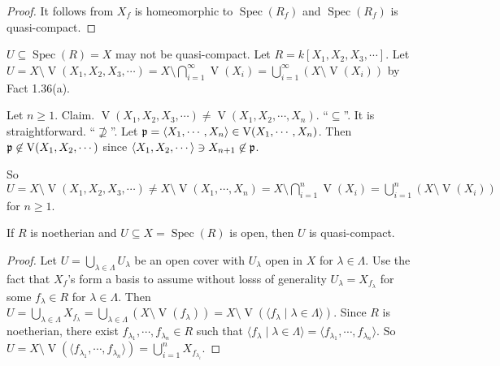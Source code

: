 \begin{proof}
    It follows from $X_f$ is homeomorphic to $\operatorname{Spec}(R_f)$ and $\operatorname{Spec}(R_f)$ is quasi-compact.
\end{proof}

\begin{example*}
    $U \subseteq \operatorname{Spec}(R) = X$ may not be quasi-compact. Let $R = k[X_1,X_2,X_3,\cdots]$. Let $U = X \setminus \operatorname{V}(X_1,X_2,X_3,\cdots) = X \setminus \bigcap_{i=1}^{\infty} \operatorname{V}(X_i) = \bigcup_{i=1}^\infty (X \setminus \operatorname{V}(X_i))$ by Fact 1.36(a). \par 
    Let $n \geq 1$. Claim. $\operatorname{V}(X_1,X_2,X_3,\cdots) \neq \operatorname{V}(X_1,X_2,\cdots,X_n)$. ``$\subseteq$''. It is straightforward. ``$\not \supseteq$''. Let $\mathfrak{p} = \langle X_1,\cdots,X_n \rangle \in \operatorname{V}(X_1,\cdots,X_n)$. Then $\mathfrak{p} \not \in \operatorname{V}(X_1,X_2,\cdots)$ since $\langle X_1,X_2,\cdots \rangle\ni X_{n+1} \not \in \mathfrak{p}$. \par 
    So $U = X \setminus \operatorname{V}(X_1,X_2,X_3,\cdots) \neq X \setminus \operatorname{V}(X_1,\cdots,X_n) = X \setminus \bigcap_{i=1}^{n} \operatorname{V}(X_i) = \bigcup_{i=1}^n (X \setminus \operatorname{V}(X_i))$ for $n \geq 1$. 
\end{example*}

\begin{fact*}
    If $R$ is noetherian and $U \subseteq X = \operatorname{Spec}(R)$ is open, then $U$ is quasi-compact. 
\end{fact*}

\begin{proof}
    Let $U = \bigcup_{\lambda \in \Lambda}U_\lambda$ be an open cover with $U_\lambda$ open in $X$ for $\lambda \in \Lambda$. Use the fact that $X_f$'s form a basis to assume without losss of generality $U_\lambda = X_{f_\lambda}$ for some $f_\lambda \in R$ for $\lambda \in \Lambda$. Then $U = \bigcup_{\lambda \in \Lambda} X_{f_\lambda} = \bigcup_{\lambda \in \Lambda} (X \setminus \operatorname{V}(f_\lambda)) = X \setminus \operatorname{V}(\langle f_\lambda \mid \lambda \in \Lambda \rangle)$. Since $R$ is noetherian, there exist $f_{\lambda_1},\cdots,f_{\lambda_n} \in R$ such that $\langle f_\lambda \mid \lambda \in \Lambda \rangle = \langle f_{\lambda_1},\cdots,f_{\lambda_n} \rangle$. So $U = X \setminus \operatorname{V}(\langle f_{\lambda_1},\cdots,f_{\lambda_n} \rangle) = \bigcup_{i=1}^n X_{f_{\lambda_i}}$. 
\end{proof}

